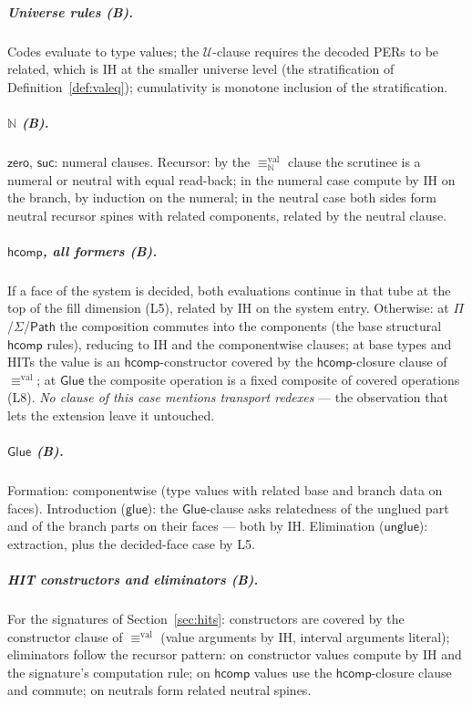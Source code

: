 \documentclass{lmcs}
\newcommand{\hcomp}{\mathsf{hcomp}}
\newcommand{\Glue}{\mathsf{Glue}}
\newcommand{\glue}{\mathsf{glue}}
\newcommand{\unglue}{\mathsf{unglue}}
\newcommand{\valeq}{\equiv^{\mathrm{val}}}
\newcommand{\Path}{\mathsf{Path}}
\newcommand{\U}{\mathcal{U}}
\begin{document}
\subparagraph*{Universe rules (B).}  Codes evaluate to type values;
the $\U$-clause requires the decoded PERs to be related, which is IH
at the smaller universe level (the stratification of
Definition~\ref{def:valeq}); cumulativity is monotone inclusion of
the stratification.

\subparagraph*{$\mathbb{N}$ (B).}  $\mathsf{zero}$, $\mathsf{suc}$:
numeral clauses.  Recursor: by the $\valeq_{\mathbb{N}}$ clause the
scrutinee is a numeral or neutral with equal read-back; in the
numeral case compute by IH on the branch, by induction on the
numeral; in the neutral case both sides form neutral recursor spines
with related components, related by the neutral clause.

\subparagraph*{$\hcomp$, all formers (B).}  If a face of the system
is decided, both evaluations continue in that tube at the top of the
fill dimension (L5), related by IH on the system entry.  Otherwise:
at $\Pi$/$\Sigma$/$\Path$ the composition commutes into the
components (the base structural $\hcomp$ rules), reducing to IH and
the componentwise clauses; at base types and HITs the value is an
$\hcomp$-constructor covered by the $\hcomp$-closure clause of
$\valeq$; at $\Glue$ the composite operation is a fixed composite of
covered operations (L8).  \emph{No clause of this case mentions
transport redexes} --- the observation that lets the extension leave
it untouched.

\subparagraph*{$\Glue$ (B).}  Formation: componentwise (type values
with related base and branch data on faces).  Introduction
($\glue$): the $\Glue$-clause asks relatedness of the unglued part
and of the branch parts on their faces --- both by IH.  Elimination
($\unglue$): extraction, plus the decided-face case by L5.

\subparagraph*{HIT constructors and eliminators (B).}  For the
signatures of Section~\ref{sec:hits}: constructors are covered by
the constructor clause of $\valeq$ (value arguments by IH, interval
arguments literal); eliminators follow the recursor pattern: on
constructor values compute by IH and the signature's computation
rule; on $\hcomp$ values use the $\hcomp$-closure clause and
commute; on neutrals form related neutral spines.
\end{document}

